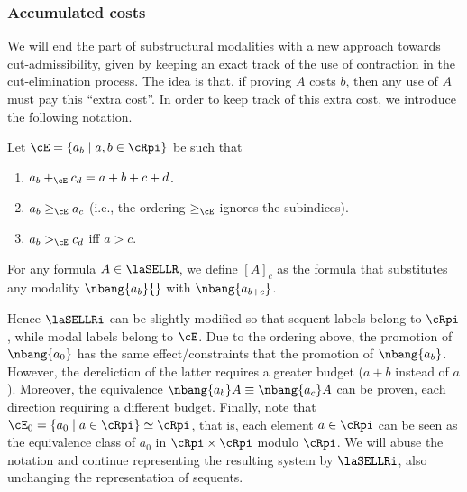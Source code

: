 \subsubsection{Accumulated costs}
We will end the part of substructural modalities with a new approach towards cut-admissibility, given by keeping an exact track of the use of contraction in the cut-elimination process.  
The idea is that, if proving $A$ costs $b$, then any use of $A$  
must pay this ``extra cost''. In order to keep track of this extra cost, we introduce the following notation.


\begin{definition}
Let $\cE=\{a_b\mid a,b\in \cRpi\}$ be such that 
\begin{enumerate}
\item $a_b+_\cE c_d=a+b+c+d$.
\item $a_b \geq_\cE a_c$ (i.e., the ordering $\geq_\cE$ ignores the subindices).
\item $a_b >_\cE c_d$ iff $a>c$.
\end{enumerate}
For any formula $A\in\laSELLR$, we define $[A]_c$ as the formula that substitutes any 
modality $\nbang{a_b}{}$ with $\nbang{a_{b+c}}$.
\end{definition}
Hence $\laSELLRi$ can be slightly modified so that sequent labels belong to  $\cRpi$, while modal labels belong to $\cE$. Due to the ordering above, the promotion of $\nbang{a_0}$ 
has the same effect/constraints that the promotion of $\nbang{a_b}$. However, the dereliction of the latter requires a greater budget ($a+b$ instead of $a$). Moreover, the equivalence $\nbang{a_b}A \equiv \nbang{a_c}A$ can be proven, each direction requiring a different budget.
Finally, note that $\cE_0=\{a_0\mid a\in \cRpi\}\simeq \cRpi$, that is, each element $a\in\cRpi$ can be seen as the equivalence class of $a_0$ in $\cRpi\times \cRpi$ modulo $\cRpi$.
We will abuse the notation and continue representing the resulting system by $\laSELLRi$, also unchanging the representation of sequents. 


